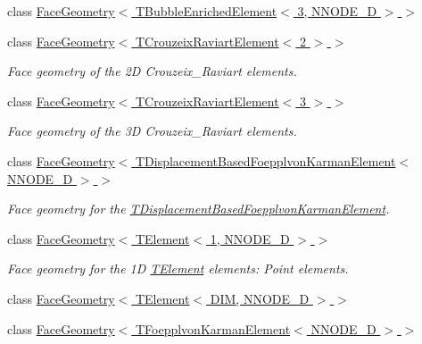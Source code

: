 \begin{DoxyCompactItemize}
\item 
class \hyperlink{classoomph_1_1FaceGeometry_3_01TBubbleEnrichedElement_3_013_00_01NNODE__1D_01_4_01_4}{Face\+Geometry$<$ T\+Bubble\+Enriched\+Element$<$ 3, N\+N\+O\+D\+E\+\_\+D $>$ $>$}
\item 
class \hyperlink{classoomph_1_1FaceGeometry_3_01TCrouzeixRaviartElement_3_012_01_4_01_4}{Face\+Geometry$<$ T\+Crouzeix\+Raviart\+Element$<$ 2 $>$ $>$}
\begin{DoxyCompactList}\small\item\em Face geometry of the 2D Crouzeix\+\_\+\+Raviart elements. \end{DoxyCompactList}\item 
class \hyperlink{classoomph_1_1FaceGeometry_3_01TCrouzeixRaviartElement_3_013_01_4_01_4}{Face\+Geometry$<$ T\+Crouzeix\+Raviart\+Element$<$ 3 $>$ $>$}
\begin{DoxyCompactList}\small\item\em Face geometry of the 3D Crouzeix\+\_\+\+Raviart elements. \end{DoxyCompactList}\item 
class \hyperlink{classoomph_1_1FaceGeometry_3_01TDisplacementBasedFoepplvonKarmanElement_3_01NNODE__1D_01_4_01_4}{Face\+Geometry$<$ T\+Displacement\+Based\+Foepplvon\+Karman\+Element$<$ N\+N\+O\+D\+E\+\_\+D $>$ $>$}
\begin{DoxyCompactList}\small\item\em Face geometry for the \hyperlink{classoomph_1_1TDisplacementBasedFoepplvonKarmanElement}{T\+Displacement\+Based\+Foepplvon\+Karman\+Element}. \end{DoxyCompactList}\item 
class \hyperlink{classoomph_1_1FaceGeometry_3_01TElement_3_011_00_01NNODE__1D_01_4_01_4}{Face\+Geometry$<$ T\+Element$<$ 1, N\+N\+O\+D\+E\+\_\+D $>$ $>$}
\begin{DoxyCompactList}\small\item\em Face geometry for the 1D \hyperlink{classoomph_1_1TElement}{T\+Element} elements\+: Point elements. \end{DoxyCompactList}\item 
class \hyperlink{classoomph_1_1FaceGeometry_3_01TElement_3_01DIM_00_01NNODE__1D_01_4_01_4}{Face\+Geometry$<$ T\+Element$<$ D\+I\+M, N\+N\+O\+D\+E\+\_\+D $>$ $>$}
\item 
class \hyperlink{classoomph_1_1FaceGeometry_3_01TFoepplvonKarmanElement_3_01NNODE__1D_01_4_01_4}{Face\+Geometry$<$ T\+Foepplvon\+Karman\+Element$<$ N\+N\+O\+D\+E\+\_\+D $>$ $>$}

\end{DoxyCompactItemize}
